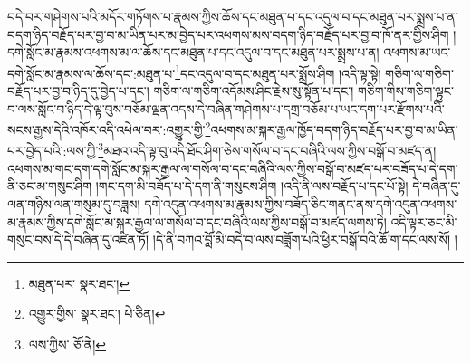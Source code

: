 བདེ་བར་གཤེགས་པའི་མདོར་གཏོགས་པ་རྣམས་ཀྱིས་ཆོས་དང་མཐུན་པ་དང་འདུལ་བ་དང་མཐུན་པར་སྨྲས་པ་ན་བདག་ཉིད་བརྗོད་པར་བྱ་བ་མ་ཡིན་པར་མ་བྱེད་པར་འཕགས་མས་བདག་ཉིད་བརྗོད་པར་བྱ་བ་ཁོ་ནར་གྱིས་ཤིག །དགེ་སློང་མ་རྣམས་འཕགས་མ་ལ་ཆོས་དང་མཐུན་པ་དང་འདུལ་བ་དང་མཐུན་པར་སྨྲས་པ་ན། འཕགས་མ་ཡང་དགེ་སློང་མ་རྣམས་ལ་ཆོས་དང་:མཐུན་པ་\footnote{མཐུན་པར་  སྣར་ཐང་། }དང་འདུལ་བ་དང་མཐུན་པར་སྨྲོས་ཤིག །འདི་ལྟ་སྟེ། གཅིག་ལ་གཅིག་བརྗོད་པར་བྱ་བ་ཉིད་དུ་བྱེད་པ་དང་། གཅིག་ལ་གཅིག་འདོམས་ཤིང་རྗེས་སུ་སྟོན་པ་དང་། གཅིག་གིས་གཅིག་ལྟུང་བ་ལས་སློང་བ་ཉིད་དེ་ལྟ་བུས་བཅོམ་ལྡན་འདས་དེ་བཞིན་གཤེགས་པ་དགྲ་བཅོམ་པ་ཡང་དག་པར་རྫོགས་པའི་སངས་རྒྱས་དེའི་འཁོར་འདི་འཕེལ་བར་:འགྱུར་གྱི་\footnote{འགྱུར་གྱིས་  སྣར་ཐང་།  པེ་ཅིན། }འཕགས་མ་སྐར་རྒྱལ་ཁྱོད་བདག་ཉིད་བརྗོད་པར་བྱ་བ་མ་ཡིན་པར་བྱེད་པའི་:ལས་ཀྱི་\footnote{ལས་ཀྱིས་  ཅོ་ནེ། }མཐའ་འདི་ལྟ་བུ་འདི་ཐོང་ཤིག་ཅེས་གསོལ་བ་དང་བཞིའི་ལས་ཀྱིས་བསྒོ་བ་མཛད་ན། འཕགས་མ་གང་དག་དགེ་སློང་མ་སྐར་རྒྱལ་ལ་གསོལ་བ་དང་བཞིའི་ལས་ཀྱིས་བསྒོ་བ་མཛད་པར་བཟོད་པ་དེ་དག་ནི་ཅང་མ་གསུང་ཤིག །གང་དག་མི་བཟོད་པ་དེ་དག་ནི་གསུངས་ཤིག །འདི་ནི་ལས་བརྗོད་པ་དང་པོ་སྟེ། དེ་བཞིན་དུ་ལན་གཉིས་ལན་གསུམ་དུ་བཟླས། དགེ་འདུན་འཕགས་མ་རྣམས་ཀྱིས་བཟོད་ཅིང་གནང་ནས་དགེ་འདུན་འཕགས་མ་རྣམས་ཀྱིས་དགེ་སློང་མ་སྐར་རྒྱལ་ལ་གསོལ་བ་དང་བཞིའི་ལས་ཀྱིས་བསྒོ་བ་མཛད་ལགས་ཏེ། འདི་ལྟར་ཅང་མི་གསུང་བས་དེ་དེ་བཞིན་དུ་འཛིན་ཏོ། །དེ་ནི་བཀའ་བློ་མི་བདེ་བ་ལས་བཟློག་པའི་ཕྱིར་བསྒོ་བའི་ཆོ་ག་དང་ལས་སོ། །
